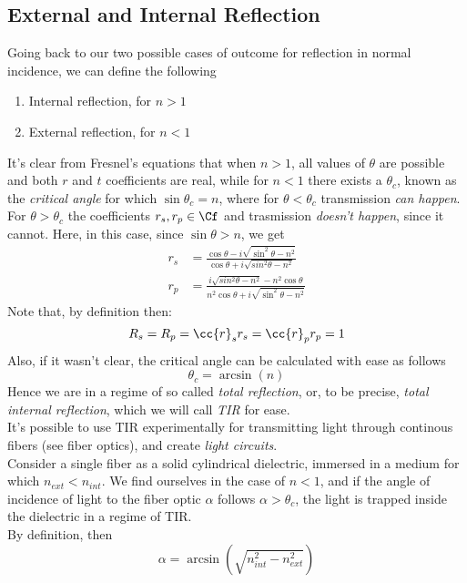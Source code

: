 \documentclass[../electromagnetism.tex]{subfiles}
\begin{document}
\subsection{External and Internal Reflection}
Going back to our two possible cases of outcome for reflection in normal incidence, we can define the following
\begin{enumerate}
\item Internal reflection, for $n>1$
\item External reflection, for $n<1$
\end{enumerate}
It's clear from Fresnel's equations that when $n>1$, all values of $\theta$ are possible and both $r$ and $t$ coefficients are real, while for $n<1$ there exists a $\theta_c$, known as the \emph{critical angle} for which $\sin\theta_c=n$, where for $\theta<\theta_c$ transmission \textit{can happen}.\\
For $\theta>\theta_c$ the coefficients $r_s,r_p\in\Cf$ and trasmission \textit{doesn't happen}, since it cannot. Here, in this case, since $\sin\theta>n$, we get
\begin{equation}
	\begin{aligned}
		r_s&= \frac{\cos\theta-i\sqrt{\sin^2\theta-n^2}}{\cos\theta+i\sqrt{sin^2\theta-n^2}}\\
		r_p&= \frac{i\sqrt{sin^2\theta-n^2}-n^2\cos\theta}{n^2\cos\theta+i\sqrt{\sin^2\theta-n^2}}
	\end{aligned}
	\label{eq:complexreflectioncoeff}
\end{equation}
Note that, by definition then:
\begin{equation}
	R_s=R_p=\cc{r}_sr_s=\cc{r}_pr_p=1
	\label{eq:totalreflectiondef}
\end{equation}
Also, if it wasn't clear, the critical angle can be calculated with ease as follows
\begin{equation}
	\theta_c=\arcsin(n)
	\label{eq:criticalangle}
\end{equation}
Hence we are in a regime of so called \textit{total reflection}, or, to be precise, \textit{total internal reflection}, which we will call \emph{TIR} for ease.\\
It's possible to use TIR experimentally for transmitting light through continous fibers (see fiber optics), and create \emph{light circuits}.\\
Consider a single fiber as a solid cylindrical dielectric, immersed in a medium for which $n_{ext}<n_{int}$. We find ourselves in the case of $n<1$, and if the angle of incidence of light to the fiber optic $\alpha$ follows $\alpha>\theta_c$, the light is trapped inside the dielectric in a regime of TIR.\\
By definition, then
\begin{equation}
	\alpha=\arcsin\left( \sqrt{n_{int}^2-n_{ext}^2} \right)
	\label{eq:tircable}
\end{equation}
\end{document}
